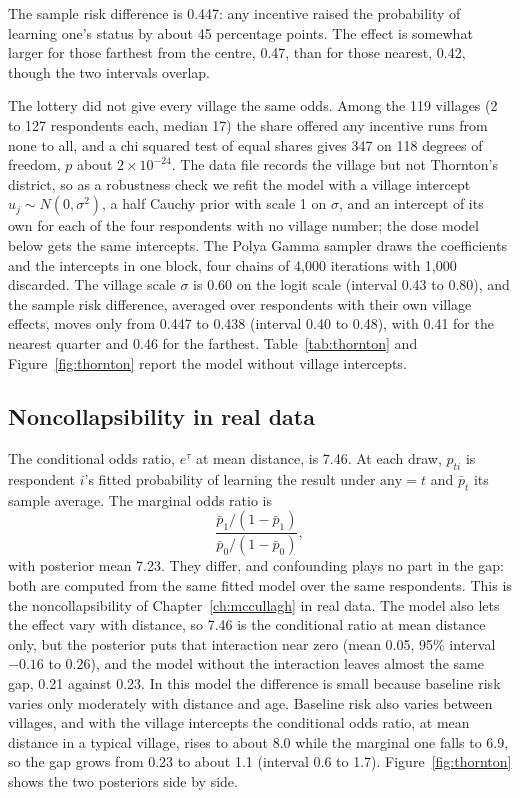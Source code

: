 The sample risk difference is 0.447: any incentive raised the probability of learning one's status by about 45 percentage points. The effect is somewhat larger for those farthest from the centre, 0.47, than for those nearest, 0.42, though the two intervals overlap.

The lottery did not give every village the same odds. Among the 119 villages (2 to 127 respondents each, median 17) the share offered any incentive runs from none to all, and a chi squared test of equal shares gives 347 on 118 degrees of freedom, $p$ about $2 \times 10^{-24}$. The data file records the village but not Thornton's district, so as a robustness check we refit the model with a village intercept $u_j \sim N(0, \sigma^2)$, a half Cauchy prior with scale 1 on $\sigma$, and an intercept of its own for each of the four respondents with no village number; the dose model below gets the same intercepts. The Polya Gamma sampler draws the coefficients and the intercepts in one block, four chains of 4,000 iterations with 1,000 discarded. The village scale $\sigma$ is 0.60 on the logit scale (interval 0.43 to 0.80), and the sample risk difference, averaged over respondents with their own village effects, moves only from 0.447 to 0.438 (interval 0.40 to 0.48), with 0.41 for the nearest quarter and 0.46 for the farthest. Table~\ref{tab:thornton} and Figure~\ref{fig:thornton} report the model without village intercepts.

\subsection{Noncollapsibility in real data}

The conditional odds ratio, $e^\tau$ at mean distance, is 7.46. At each draw, $p_{ti}$ is respondent $i$'s fitted probability of learning the result under $\mathrm{any} = t$ and $\bar p_t$ its sample average. The marginal odds ratio is
\[
\frac{\bar p_1/(1-\bar p_1)}{\bar p_0/(1-\bar p_0)},
\]
with posterior mean 7.23. They differ, and confounding plays no part in the gap: both are computed from the same fitted model over the same respondents. This is the noncollapsibility of Chapter~\ref{ch:mccullagh} in real data. The model also lets the effect vary with distance, so 7.46 is the conditional ratio at mean distance only, but the posterior puts that interaction near zero (mean 0.05, 95\% interval $-0.16$ to $0.26$), and the model without the interaction leaves almost the same gap, 0.21 against 0.23. In this model the difference is small because baseline risk varies only moderately with distance and age. Baseline risk also varies between villages, and with the village intercepts the conditional odds ratio, at mean distance in a typical village, rises to about 8.0 while the marginal one falls to 6.9, so the gap grows from 0.23 to about 1.1 (interval 0.6 to 1.7). Figure~\ref{fig:thornton} shows the two posteriors side by side.

